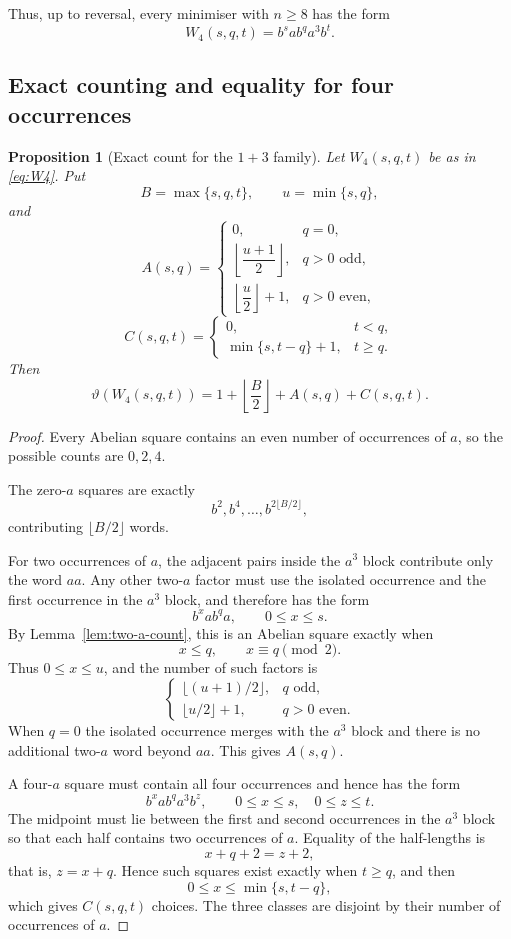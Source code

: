 \documentclass[11pt]{article}
\newtheorem{proposition}[theorem]{Proposition}
\theoremstyle{definition}
\newcommand{\thetaas}{\vartheta}
\begin{document}
Thus, up to reversal, every minimiser with $n\ge8$ has the form
\begin{equation}\label{eq:W4}
 W_4(s,q,t)=b^s a b^q a^3 b^t.
\end{equation}

\subsection{Exact counting and equality for four occurrences}

\begin{proposition}[Exact count for the $1+3$ family]\label{prop:x4-count}
Let $W_4(s,q,t)$ be as in \eqref{eq:W4}. Put
\[
 B=\max\{s,q,t\},\qquad u=\min\{s,q\},
\]
and
\[
 A(s,q)=
 \begin{cases}
 0,&q=0,\\
 \left\lfloor\dfrac{u+1}{2}\right\rfloor,&q>0\text{ odd},\\
 \left\lfloor\dfrac u2\right\rfloor+1,&q>0\text{ even},
 \end{cases}
\]
\[
 C(s,q,t)=
 \begin{cases}
 0,&t<q,\\
 \min\{s,t-q\}+1,&t\ge q.
 \end{cases}
\]
Then
\[
 \thetaas(W_4(s,q,t))
 =1+\left\lfloor\frac B2\right\rfloor+A(s,q)+C(s,q,t).
\]
\end{proposition}

\begin{proof}
Every Abelian square contains an even number of occurrences of $a$, so the possible counts are $0,2,4$.

The zero-$a$ squares are exactly
\[
 b^2,b^4,\ldots,b^{2\lfloor B/2\rfloor},
\]
contributing $\lfloor B/2\rfloor$ words.

For two occurrences of $a$, the adjacent pairs inside the $a^3$ block contribute only the word $aa$. Any other two-$a$ factor must use the isolated occurrence and the first occurrence in the $a^3$ block, and therefore has the form
\[
 b^x a b^q a,
 \qquad 0\le x\le s.
\]
By Lemma~\ref{lem:two-a-count}, this is an Abelian square exactly when
\[
 x\le q,\qquad x\equiv q\pmod2.
\]
Thus $0\le x\le u$, and the number of such factors is
\[
 \begin{cases}
 \lfloor(u+1)/2\rfloor,&q\text{ odd},\\
 \lfloor u/2\rfloor+1,&q>0\text{ even}.
 \end{cases}
\]
When $q=0$ the isolated occurrence merges with the $a^3$ block and there is no additional two-$a$ word beyond $aa$. This gives $A(s,q)$.

A four-$a$ square must contain all four occurrences and hence has the form
\[
 b^x a b^q a^3 b^z,
 \qquad0\le x\le s,\quad0\le z\le t.
\]
The midpoint must lie between the first and second occurrences in the $a^3$ block so that each half contains two occurrences of $a$. Equality of the half-lengths is
\[
 x+q+2=z+2,
\]
that is, $z=x+q$. Hence such squares exist exactly when $t\ge q$, and then
\[
 0\le x\le\min\{s,t-q\},
\]
which gives $C(s,q,t)$ choices. The three classes are disjoint by their number of occurrences of $a$.
\end{proof}
\end{document}
